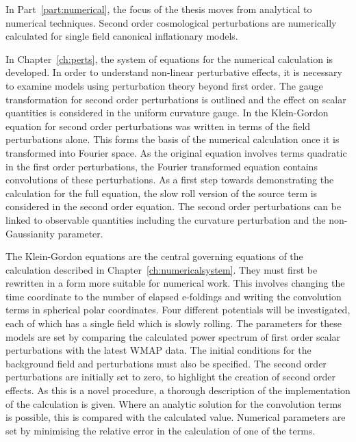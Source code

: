 In Part~\ref{part:numerical}, the focus of the thesis moves from analytical to
numerical
techniques. Second order cosmological perturbations are numerically calculated for
single field canonical inflationary models.

In Chapter~\ref{ch:perts}, the system of equations for the numerical calculation is
developed. In order to understand non-linear perturbative effects, it is necessary to
examine models using perturbation theory beyond first order. The gauge
transformation for second order perturbations is outlined and the effect on
scalar quantities is considered in the uniform curvature gauge. In
 the Klein-Gordon equation for second order perturbations was
written in terms of the field perturbations alone. This forms the basis of the
numerical calculation once it is transformed into Fourier space. As the original
equation involves terms quadratic in the first order perturbations, the Fourier
transformed equation contains convolutions of these perturbations. As a first step
towards demonstrating the calculation for the full equation, the slow roll version of
the source term is considered in the second order equation. The second order
perturbations can be linked to observable quantities including the curvature
perturbation and the non-Gaussianity parameter.



The Klein-Gordon equations are the central governing equations of the 
calculation described in Chapter~\ref{ch:numericalsystem}. They must first be
rewritten in a form more suitable for numerical work. This involves changing the
time coordinate to the number of elapsed e-foldings and writing the convolution
terms in spherical polar coordinates. Four different 
potentials will be investigated, each of which has a single field which is slowly rolling. The
parameters for these models are set by
comparing
the calculated power spectrum of first order scalar perturbations with the latest
WMAP data. The initial conditions for the background field and perturbations must
also be specified. The second order perturbations are initially set to zero, to
highlight the creation of second order effects. As this is a novel procedure, a
thorough description of the implementation of the calculation is given. Where
an analytic solution for the convolution terms is possible, this is compared
with the calculated value. Numerical parameters are set by minimising the relative
error in the calculation of one of the terms.


